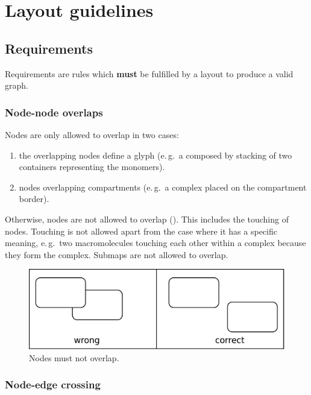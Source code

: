 \newpage

\section{Layout guidelines}

\subsection{Requirements}

Requirements are rules which \textbf{must} be fulfilled by a layout to
produce a valid \SBGNPDLone graph.

\subsubsection{Node-node overlaps}

Nodes are only allowed to overlap in two cases:
\begin{enumerate}
  \item the overlapping nodes define a glyph (e.\,g.~a 
  composed by stacking of two containers representing the monomers).
  \item nodes overlapping compartments
  (e.\,g.~a complex placed on the compartment border).
\end{enumerate}
Otherwise, nodes are not allowed to overlap (). This includes the
touching of nodes. Touching is not allowed apart from the case where
it has a specific meaning, e.\,g.~two macromolecules touching each
other within a complex because they form the complex. Submaps
are not allowed to overlap. 

\begin{figure}[h!]
  \centering
  \includegraphics[scale=0.3]{images/layout-node-node}
  \caption{Nodes must not overlap.}\label{fig:layout1}
\end{figure}

\subsubsection{Node-edge crossing}\label{crosEdNoRe}

